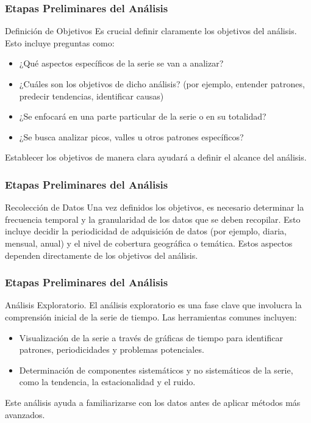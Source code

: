 \documentclass{beamer}
\begin{document}
  \begin{frame}
	\frametitle{Etapas Preliminares del Análisis}
	\begin{block}{Definición de Objetivos}
	Es crucial definir claramente los objetivos del análisis. Esto incluye preguntas como:
    \begin{itemize}
        \item ¿Qué aspectos específicos de la serie se van a analizar?
        \item ¿Cuáles son los objetivos de dicho análisis? (por ejemplo, entender patrones, predecir tendencias, identificar causas)
        \item ¿Se enfocará en una parte particular de la serie o en su totalidad?
        \item ¿Se busca analizar picos, valles u otros patrones específicos?
    \end{itemize}
    Establecer los objetivos de manera clara ayudará a definir el alcance del análisis.
	\end{block}
  \end{frame}

  \begin{frame}
	\frametitle{Etapas Preliminares del Análisis}
	\begin{block}{Recolección de Datos}
		Una vez definidos los objetivos, es necesario determinar la frecuencia temporal y la granularidad de los datos que se deben recopilar. Esto incluye decidir la periodicidad de adquisición de datos (por ejemplo, diaria, mensual, anual) y el nivel de cobertura geográfica o temática. Estos aspectos dependen directamente de los objetivos del análisis.
	\end{block}
  \end{frame}

  \begin{frame}
	\frametitle{Etapas Preliminares del Análisis}
	\begin{block}{Análisis Exploratorio.}
		El análisis exploratorio es una fase clave que involucra la comprensión inicial de la serie de tiempo. Las herramientas comunes incluyen:
    \begin{itemize}
        \item Visualización de la serie a través de gráficas de tiempo para identificar patrones, periodicidades y problemas potenciales.
        \item Determinación de componentes sistemáticos y no sistemáticos de la serie, como la tendencia, la estacionalidad y el ruido.
    \end{itemize}
    Este análisis ayuda a familiarizarse con los datos antes de aplicar métodos más avanzados.
	\end{block}
  \end{frame}
\end{document}
